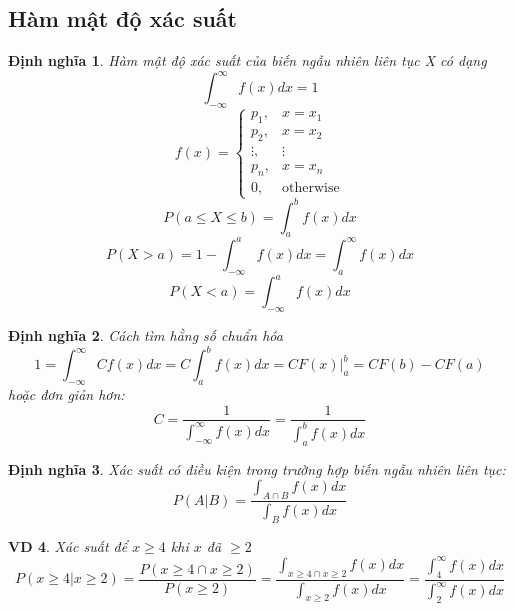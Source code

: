 \documentclass[12pt]{article}
\newtheorem{thm}{Định nghĩa}
\newtheorem{ex}[thm]{VD}
\begin{document}
\subsection{Hàm mật độ xác suất}
\begin{thm}
Hàm mật độ xác suất của biến ngẫu nhiên liên tục X có dạng
\begin {equation}
\int_{-\infty}^{\infty} f(x)dx = 1
\end{equation}
\begin {equation}
f(x) = \begin{cases}
p_1, & x = x_1 \\
p_2, & x = x_2 \\
\vdots, & \vdots \\
p_n, & x = x_n \\
0, & \text{otherwise}
\end{cases}
\end{equation}
\begin {equation}
P(a \leq X \leq b) = \int_a^b f(x)dx
\end{equation}
\begin {equation}
P(X > a) = 1 - \int_{-\infty}^a f(x)dx = \int_a^{\infty} f(x)dx
\end{equation}
\begin {equation}
P(X < a) = \int_{-\infty}^a f(x)dx
\end{equation}
\end{thm}

\begin {thm}
Cách tìm hằng số chuẩn hóa
\begin {equation}
1 = \int_{-\infty}^{\infty} Cf(x)dx = C\int_a^b f(x)dx = CF(x)|^b_a = CF(b) - CF(a)
\end{equation}
hoặc đơn giản hơn:
\begin{equation}
    C = \frac{1}{\int_{-\infty}^{\infty}f(x)dx} = \frac{1}{\int_{a}^{b}f(x)dx}
\end{equation}
\end{thm}

\begin{thm}
    Xác suất có điều kiện trong trường hợp biến ngẫu nhiên liên tục:
    \begin{equation}
    P(A|B) = \frac{\int_{A \cap B} f(x)dx}{\int_B f(x)dx}
    \end{equation}
\end{thm}
\begin{ex}
    Xác suất để $x \geq 4$ khi $x$ đã $\geq 2$
    \begin{equation}
    P(x \geq 4 | x \geq 2) = \frac{P(x \geq 4 \cap x \geq 2)}{P(x \geq 2)} = \frac{\int_{x \geq 4 \cap x \geq 2} f(x)dx}{\int_{x \geq 2} f(x)dx} = \frac{\int_{4}^{\infty} f(x)dx}{\int_{2}^{\infty} f(x)dx}
    \end{equation}
\end{ex}
\end{document}
